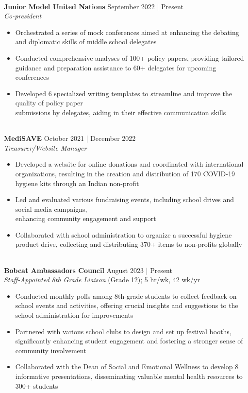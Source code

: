 \documentclass[a4paper,10pt]{extarticle}
\begin{document}
\noindent
\\ \textbf{Junior Model United Nations} \hfill September 2022 | Present \\
\textit{Co-president}
\begin{itemize}
    \item Orchestrated a series of mock conferences aimed at enhancing the debating and diplomatic skills of middle school delegates
    \item Conducted comprehensive analyses of 100+ policy papers, providing tailored guidance and preparation assistance to 60+ delegates for upcoming conferences
    \item Developed 6 specialized writing templates to streamline and improve the quality of policy paper \\
    submissions by delegates, aiding in their effective communication skills
\end{itemize}

\newpage

\noindent
\\ \textbf{MediSAVE} \hfill October 2021 | December 2022 \\
\textit{Treasurer/Website Manager}
\begin{itemize}
    \item Developed a website for online donations and coordinated with international organizations, resulting in the creation and distribution of 170 COVID-19 hygiene kits through an Indian non-profit
    \item Led and evaluated various fundraising events, including school drives and social media campaigns, \\ enhancing community engagement and support
    \item Collaborated with school administration to organize a successful hygiene product drive, collecting and distributing 370+ items to non-profits globally
\end{itemize}

\noindent
\\ \textbf{Bobcat Ambassadors Council} \hfill August 2023 | Present \\
\textit{Staff-Appointed 8th Grade Liaison} \hfill (Grade 12); 5 hr/wk, 42 wk/yr
\begin{itemize}
    \item Conducted monthly polls among 8th-grade students to collect feedback on school events and activities, offering crucial insights and suggestions to the school administration for improvements
    \item Partnered with various school clubs to design and set up festival booths, significantly enhancing student engagement and fostering a stronger sense of community involvement
    \item Collaborated with the Dean of Social and Emotional Wellness to develop 8 informative presentations, disseminating valuable mental health resources to 300+ students
\end{itemize}
\end{document}
